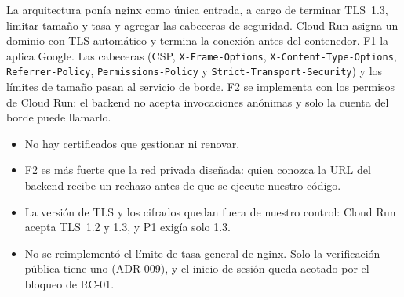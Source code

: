 \documentclass[11pt,a4paper]{article}
\theoremstyle{definition}
\theoremstyle{remark}
\newcommand{\code}[1]{\texttt{#1}}
\begin{document}
\adrctx La arquitectura ponía nginx como única entrada, a cargo de terminar
TLS~1.3, limitar tamaño y tasa y agregar las cabeceras de seguridad. Cloud
Run asigna un dominio con TLS automático y termina la conexión antes del
contenedor.
\adrdec F1 la aplica Google. Las cabeceras (CSP, \code{X-Frame-Options},
\code{X-Content-Type-Options}, \code{Referrer-Policy},
\code{Permissions-Policy} y \code{Strict-Transport-Security}) y los límites
de tamaño pasan al servicio de borde. F2 se implementa con los permisos de
Cloud Run: el backend no acepta invocaciones anónimas y solo la cuenta del
borde puede llamarlo.
\adrpos
\begin{itemize}
  \item No hay certificados que gestionar ni renovar.
  \item F2 es más fuerte que la red privada diseñada: quien conozca la URL del
    backend recibe un rechazo antes de que se ejecute nuestro código.
\end{itemize}
\adrneg
\begin{itemize}
  \item La versión de TLS y los cifrados quedan fuera de nuestro control:
    Cloud Run acepta TLS~1.2 y 1.3, y P1 exigía solo 1.3.
  \item No se reimplementó el límite de tasa general de nginx. Solo la
    verificación pública tiene uno (ADR 009), y el inicio de sesión queda
    acotado por el bloqueo de RC-01.
\end{itemize}
\end{document}
